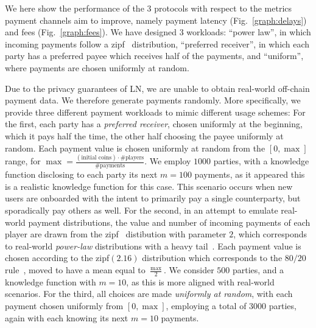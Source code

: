   We here
  show the performance of the $3$ protocols with respect to the metrics payment
  channels aim to improve, namely payment latency (Fig.~\ref{graph:delays}) and
  fees (Fig.~\ref{graph:fees}). We have designed 3 workloads: ``power law'', in
  which incoming payments follow a zipf~\cite{powers-1998-applications}
  distribution, ``preferred receiver'', in which each party has a preferred
  payee which receives half of the payments, and ``uniform'', where payments are
  chosen uniformly at random.

  Due to the privacy guarantees of LN, we are unable to obtain real-world
  off-chain payment data. We therefore generate payments randomly. More
  specifically, we provide three different payment workloads to mimic
  different usage schemes: For the first, each party has a \emph{preferred
  receiver}, chosen
  uniformly at the beginning, which it pays half the time, the other half
  choosing the payee uniformly at random. Each payment value is chosen
  uniformly at random from the $[0, \max]$ range, for $\max =
  \frac{(\text{initial coins}) \cdot \text{\#players}}{\text{\#payments}}$. We
  employ $1000$ parties, with a knowledge function disclosing to each party its
  next $m=100$ payments, as it appeared this is a realistic knowledge function
  for this case. This scenario occurs when new users are onboarded with
  the intent to primarily pay a single counterparty, but sporadically pay
  others as well. For the second, in an attempt to emulate real-world payment
  distributions, the value and number of incoming payments of each player are
  drawn from the zipf~\cite{powers-1998-applications} distibution with
  parameter $2$, which corresponds to real-world \emph{power-law} distributions
  with a heavy tail~\cite{DBLP:journals/cn/BroderKMRRSTW00}. Each payment value
  is chosen according to the
  zipf$(2.16)$ distribution which corresponds to the $80/20$
  rule~\cite{pareto}, moved to have a mean equal to $\frac{\max}{2}$. We
  consider $500$ parties, and a knowledge function with $m=10$, as this is more
  aligned with real-world scenarios. For the third, all choices are made
  \emph{uniformly at random}, with each payment chosen uniformly from $[0,
  \max]$, employing a
  total of $3000$ parties, again with each knowing its next $m=10$ payments.

